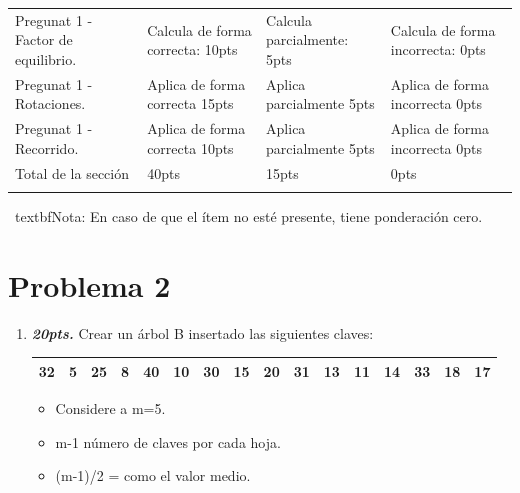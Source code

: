 \documentclass{exam}
\begin{document}
\begin{enumerate}
\begin{table}[H]
\begin{tabular}{
    !{\color{gray!50}\vrule}p{3.9cm}
    !{\color{gray!50}\vrule}p{3.6cm}
    !{\color{gray!50}\vrule}p{3.6cm}
    !{\color{gray!50}\vrule}p{3.6cm}
    !{\color{gray!50}\vrule}}
    Pregunat 1 - Factor de equilibrio. &
    Calcula de forma correcta: 10pts   &
    Calcula parcialmente: 5pts  &
    Calcula de forma incorrecta: 0pts \\  \hline

    Pregunat 1 - Rotaciones. &
    Aplica de forma correcta 15pts   &
    Aplica parcialmente 5pts &
    Aplica de forma incorrecta  0pts\\  \hline

    Pregunat 1 - Recorrido. &
    Aplica de forma correcta 10pts   &
    Aplica parcialmente 5pts &
    Aplica de forma incorrecta  0pts\\  \hline

    Total de la sección &  40pts & 15pts & 0pts\\  \hline
  \end{tabular}
  \label{tbl:1}
\end{table}

\vspace{-5mm} \ textbf{Nota:} En caso de que el ítem no esté presente,
tiene ponderación cero.

\newpage



\newpage
\vspace{-7mm}
\section{\textbf{Problema 2}}
\noindent

\begin{questions}

  \begin{enumerate}
  \item \textbf{\emph{20pts.}} Crear un árbol B insertado las siguientes claves:

  \begin{table}[H]
  \centering
  \begin{tabular}{|l|l|l|l|l|l|l|l|l|l|l|l|l|l|l|l|}
  \hline
    32&	5	&25&	8&	40&	10&	30&	15&	20&	31&	13&	11&	14&	33&	18&	17\\
  \hline
  \end{tabular}
  \end{table}

\begin{itemize}
  \item Considere a m=5.
  \item m-1 número de claves por cada hoja.
  \item (m-1)/2 = como el valor medio.
\end{itemize}


\end{enumerate}
\end{questions}
\end{enumerate}
\end{document}
